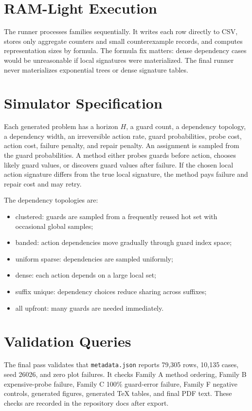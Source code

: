 \documentclass{article}
\begin{document}
\section{RAM-Light Execution}
The runner processes families sequentially. It writes each row directly to CSV, stores only aggregate counters and small counterexample records, and computes representation sizes by formula. The formula fix matters: dense dependency cases would be unreasonable if local signatures were materialized. The final runner never materializes exponential trees or dense signature tables.

\section{Simulator Specification}
Each generated problem has a horizon $H$, a guard count, a dependency topology, a dependency width, an irreversible action rate, guard probabilities, probe cost, action cost, failure penalty, and repair penalty. An assignment is sampled from the guard probabilities. A method either probes guards before action, chooses likely guard values, or discovers guard values after failure. If the chosen local action signature differs from the true local signature, the method pays failure and repair cost and may retry.

The dependency topologies are:
\begin{itemize}
\item clustered: guards are sampled from a frequently reused hot set with occasional global samples;
\item banded: action dependencies move gradually through guard index space;
\item uniform sparse: dependencies are sampled uniformly;
\item dense: each action depends on a large local set;
\item suffix unique: dependency choices reduce sharing across suffixes;
\item all upfront: many guards are needed immediately.
\end{itemize}

\section{Validation Queries}
The final pass validates that \texttt{metadata.json} reports 79,305 rows, 10,135 cases, seed 26026, and zero plot failures. It checks Family A method ordering, Family B expensive-probe failure, Family C 100\% guard-error failure, Family F negative controls, generated figures, generated TeX tables, and final PDF text. These checks are recorded in the repository docs after export.
\end{document}
